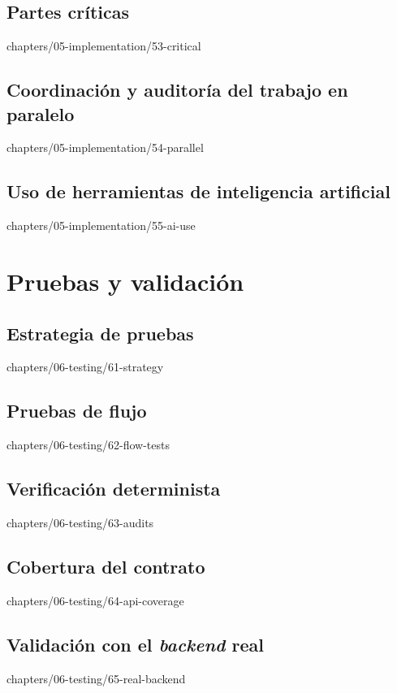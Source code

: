 \documentclass[epsbased,tfg,covers,final,printable,extendedindex,%
               firstnumbered,lof,lot,loc]{tfgtfmthesisuam}
\begin{document}
  \section{Partes críticas\label{SEC:IMP-CRITICAL}}%
          {chapters/05-implementation/53-critical}
  \section[Coordinación y auditoría del trabajo paralelo]%
          {Coordinación y auditoría del trabajo en
           paralelo\label{SEC:IMP-PARALLEL}}%
          {chapters/05-implementation/54-parallel}
  \section[Uso de herramientas de IA]%
          {Uso de herramientas de inteligencia
           artificial\label{SEC:IMP-AI}}%
          {chapters/05-implementation/55-ai-use}

\chapter{Pruebas y validación\label{CAP:TESTING}}
  \section{Estrategia de pruebas\label{SEC:TEST-STRATEGY}}%
          {chapters/06-testing/61-strategy}
  \section{Pruebas de flujo\label{SEC:TEST-FLOWS}}%
          {chapters/06-testing/62-flow-tests}
  \section{Verificación determinista\label{SEC:TEST-AUDITS}}%
          {chapters/06-testing/63-audits}
  \section{Cobertura del contrato\label{SEC:TEST-COVERAGE}}%
          {chapters/06-testing/64-api-coverage}
  \section[Validación con el backend real]%
          {Validación con el \textit{backend} real\label{SEC:TEST-REAL}}%
          {chapters/06-testing/65-real-backend}
\end{document}
